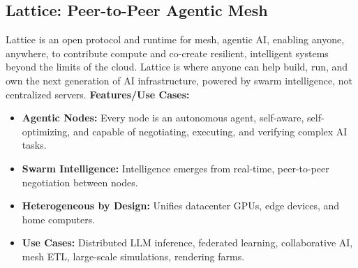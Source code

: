 \documentclass[12pt]{article}
\newcommand{\placeholder}[1]{
  \begin{tikzpicture}
    \node[draw=gray, dashed, text width=0.9\linewidth, align=center, minimum height=2cm] 
    {\footnotesize\textcolor{gray}{Placeholder for: #1}};
  \end{tikzpicture}
}
\begin{document}
\begin{multicols}{2}

\subsection{Lattice: Peer-to-Peer Agentic Mesh}
Lattice is an open protocol and runtime for mesh, agentic AI, enabling anyone, anywhere, to contribute compute and co-create resilient, intelligent systems beyond the limits of the cloud. Lattice is where anyone can help build, run, and own the next generation of AI infrastructure, powered by swarm intelligence, not centralized servers.
\vspace{0.5em}
\textbf{Features/Use Cases:}
\begin{itemize}[leftmargin=*, itemsep=0pt, topsep=2pt]
  \item \textbf{Agentic Nodes:} Every node is an autonomous agent, self-aware, self-optimizing, and capable of negotiating, executing, and verifying complex AI tasks.
  \item \textbf{Swarm Intelligence:} Intelligence emerges from real-time, peer-to-peer negotiation between nodes.
  \item \textbf{Heterogeneous by Design:} Unifies datacenter GPUs, edge devices, and home computers.
  \item \textbf{Use Cases:} Distributed LLM inference, federated learning, collaborative AI, mesh ETL, large-scale simulations, rendering farms.
\end{itemize}
\vspace{0.5em}
\begin{center}
\end{center}
\vspace{1em}


\end{multicols}
\end{document}
